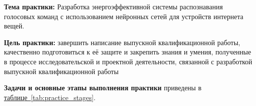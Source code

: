 
\textbf{Тема практики:} Разработка энергоэффективной системы распознавания голосовых команд с использованием нейронных сетей для устройств интернета вещей.

\textbf{Цель практики:} завершить написание выпускной квалификационной работы, качественно подготовиться к её защите и закрепить знания и умения, полученные в процессе исследовательской и проектной деятельности, связанной с разработкой выпускной квалификационной работы

\textbf{Задачи и основные этапы выполнения практики} приведены в \hyperref[tab:practice_stages]{таблице~\ref*{tab:practice_stages}}.


